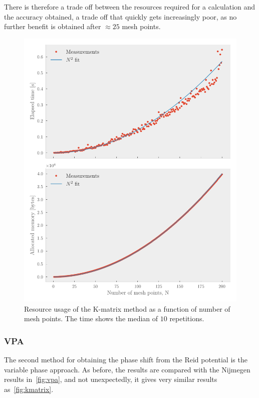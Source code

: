 There is therefore a trade off between the resources required for a calculation
and the accuracy obtained, a trade off that quickly gets increasingly poor,
as no further benefit is obtained after \(\approx 25\) mesh points.

\begin{figure}[ht!]
  \centering
  \includegraphics[]{Figures/kmatrix_measurements.pdf}
  \caption{\label{fig:kmatrix_measurements}Resource usage of the K-matrix
    method as a function of number of mesh points. The time shows the median of
    \(10\) repetitions.}
\end{figure}



\subsubsection{VPA}

The second method for obtaining the phase shift from the Reid potential is the
variable phase approach. As before, the results are compared with the Nijmegen results
in~\cref{fig:vpa}, and not unexpectedly, it gives very similar results
as~\cref{fig:kmatrix}.

